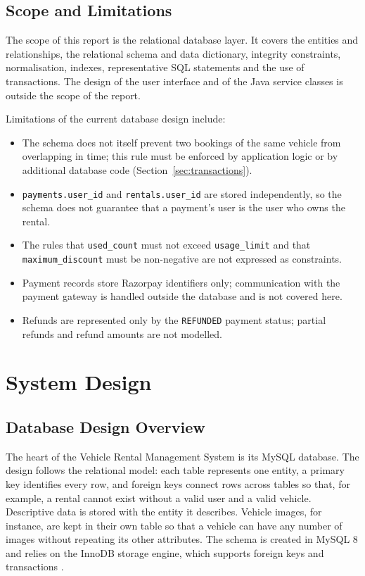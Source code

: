 \documentclass[10pt,a4paper]{report}
\newcommand{\col}[1]{\texttt{#1}}
\begin{document}
\section{Scope and Limitations}
The scope of this report is the relational database layer. It covers the entities and relationships, the relational schema and data dictionary, integrity constraints, normalisation, indexes, representative SQL statements and the use of transactions. The design of the user interface and of the Java service classes is outside the scope of the report.

Limitations of the current database design include:
\begin{itemize}
  \item The schema does not itself prevent two bookings of the same vehicle from overlapping in time; this rule must be enforced by application logic or by additional database code (Section~\ref{sec:transactions}).
  \item \col{payments.user_id} and \col{rentals.user_id} are stored independently, so the schema does not guarantee that a payment's user is the user who owns the rental.
  \item The rules that \col{used_count} must not exceed \col{usage_limit} and that \col{maximum_discount} must be non-negative are not expressed as constraints.
  \item Payment records store Razorpay identifiers only; communication with the payment gateway is handled outside the database and is not covered here.
  \item Refunds are represented only by the \col{REFUNDED} payment status; partial refunds and refund amounts are not modelled.
\end{itemize}

\chapter{System Design}

\section{Database Design Overview}
The heart of the Vehicle Rental Management System is its MySQL database. The design follows the relational model: each table represents one entity, a primary key identifies every row, and foreign keys connect rows across tables so that, for example, a rental cannot exist without a valid user and a valid vehicle. Descriptive data is stored with the entity it describes. Vehicle images, for instance, are kept in their own table so that a vehicle can have any number of images without repeating its other attributes. The schema is created in MySQL 8 and relies on the InnoDB storage engine, which supports foreign keys and transactions \cite{mysqlfk}.
\end{document}
